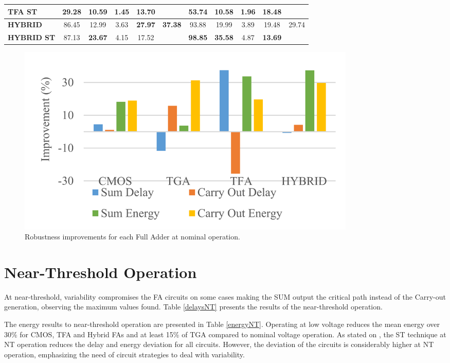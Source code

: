 \documentclass[ecp,tc, english]{iiufrgs}
\begin{document}
\begin{table}[!htbp]
{\begin{tabular}{lcccccccccc}
\textbf{TFA ST}                   & 29.28          & 10.59          & 1.45          & \textbf{13.70} &                                 & 53.74          & 10.58          & 1.96          & 18.48          &                                 \\ \hline
\textbf{HYBRID}                   & 86.45          & 12.99          & 3.63          & \textbf{27.97} & \multirow{2}{*}{\textbf{37.38}} & 93.88          & 19.99          & 3.89          & 19.48          & \multirow{2}{*}{29.74}          \\ \cline{1-5} \cline{7-10}
\textbf{HYBRID ST}                & 87.13          & \textbf{23.67} & 4.15          & 17.52          &                                 & \textbf{98.85} & \textbf{35.58} & 4.87          & \textbf{13.69} &                                 \\ \hline
\end{tabular}%
}
\end{table}

\begin{figure}[H]
\centering
\includegraphics[width=0.8\textwidth]{Nominalimprov.png}
\caption{Robustness improvements for each Full Adder at nominal operation.}
\label{fig:improvNominal}
\end{figure}

\section{Near-Threshold Operation}

At near-threshold, variability compromises the FA circuits on some cases making the SUM output the critical path instead of the Carry-out generation, observing the maximum values found. Table \ref{delaysNT} presents the results of the near-threshold operation. 

The energy results to near-threshold operation are presented in Table \ref{energyNT}. Operating at low voltage reduces the mean energy over 30\% for CMOS, TFA and Hybrid FAs and at least 15\% of TGA compared to nominal voltage operation. As stated on \cite{dokania2015circuit}, the ST technique at NT operation reduces the delay and energy deviation for all circuits. However, the deviation of the circuits is considerably higher at NT operation, emphasizing the need of circuit strategies to deal with variability. 
\end{document}

